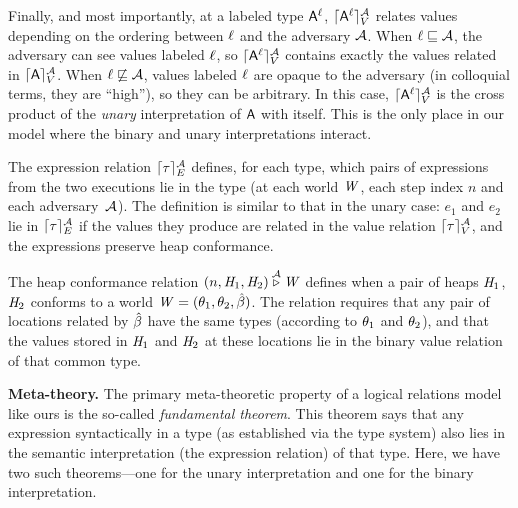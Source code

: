 Finally, and most importantly, at a labeled type $\mathsf{A}^{\ell}$,
$\lceil \mathsf{A}^{\ell} \rceil_{V}^{\mathcal{A}}$ relates values depending on the ordering
between $\ell$ and the adversary $\mathcal{A}$. When $\ell \sqsubseteq
\mathcal{A}$, the adversary can see values labeled $\ell$, so
$\lceil \mathsf{A}^{\ell} \rceil_{V}^{\mathcal{A}}$ contains exactly the values related in
$\lceil \mathsf{A} \rceil_{V}^{\mathcal{A}}$. When $\ell \not\sqsubseteq \mathcal{A}$, values labeled
$\ell$ are opaque to the adversary (in colloquial terms, they are
``high''), so they can be arbitrary. In this case,
$\lceil \mathsf{A}^{\ell} \rceil_{V}^{\mathcal{A}}$ is the cross product of the \emph{unary}
interpretation of $\mathsf{A}$ with itself. This is the only place in our
model where the binary and unary interpretations interact.

The expression relation $\lceil \tau \rceil_{E}^{\mathcal{A}}$ defines, for each type, which
pairs of expressions from the two executions lie in the type (at each
world $\mathit{W}$, each step index $n$ and each
adversary~$\mathcal{A}$). The definition is similar to that in the unary
case: $e_1$ and $e_2$ lie in $\lceil \tau \rceil_{E}^{\mathcal{A}}$ if the values they produce
are related in the value relation $\lceil \tau \rceil_{V}^{\mathcal{A}}$, and the expressions
preserve heap conformance.

The heap conformance relation $(n, \mathit{H}_1, \mathit{H}_2)
\overset{\mathcal{A}}\triangleright \mathit{W}$ defines when a pair of heaps $\mathit{H}_1$,
$\mathit{H}_2$ conforms to a world $\mathit{W}=(\theta_1, \theta_2,
\hat{\beta})$. The relation requires that any pair of locations related by
$\hat{\beta}$ have the same types (according to $\theta_1$ and $\theta_2$),
and that the values stored in $\mathit{H}_1$ and $\mathit{H}_2$ at these
locations lie in the binary value relation of that common type.

\medskip
\noindent \textbf{Meta-theory.}  The primary meta-theoretic property
of a logical relations model like ours is the so-called
\emph{fundamental theorem}. This theorem says that any expression
syntactically in a type (as established via the type system) also lies
in the semantic interpretation (the expression relation) of that
type. Here, we have two such theorems---one for the unary
interpretation and one for the binary interpretation.

